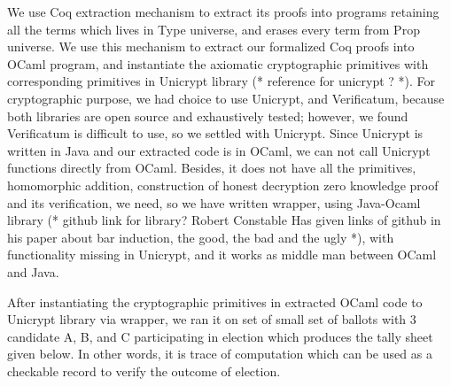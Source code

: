 \documentclass{llncs}
\begin{document}
We use Coq extraction mechanism\cite{Letouzey:2003:NEC}  to extract its proofs into programs retaining all the terms which lives in Type universe, 
and erases every term  from Prop universe. 
We use this mechanism to extract our formalized Coq proofs into
 OCaml\cite{Leroy:2013:ORM} program, and instantiate the axiomatic cryptographic 
 primitives with corresponding primitives in Unicrypt library (* reference 
 for unicrypt ? *). For cryptographic purpose, we had choice to use 
 Unicrypt, and Verificatum, because both libraries
 are open source and exhaustively tested; however, we found Verificatum is 
 difficult to use, so we settled with Unicrypt. Since Unicrypt is written 
 in Java and our extracted code is in OCaml, we can not call Unicrypt functions 
 directly from OCaml. Besides, it does not have 
 all the primitives, homomorphic addition, construction of honest 
 decryption zero knowledge proof and its verification, 
 we need, so we have written wrapper, using Java-Ocaml library 
 (* github link for library? Robert Constable Has given links 
 of github in his paper about bar induction, the good, the bad and the 
 ugly *), with functionality missing 
 in Unicrypt, and it works as middle man between OCaml  and Java.
 

 
 After instantiating the  
 cryptographic primitives in extracted OCaml code 
 to Unicrypt library via wrapper, we ran it on set of
 small set of ballots with 3 candidate A, B, and C participating in election
 which produces the tally sheet given below. In other words, 
 it is trace of computation which can be used as a checkable record to verify
 the outcome of election.
 
 
 
 
 
 
  
 
\end{document}
